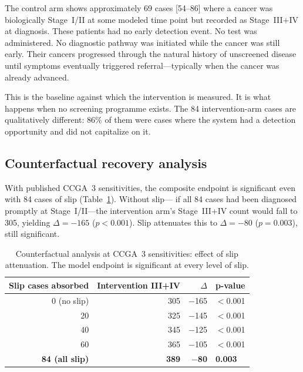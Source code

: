 \documentclass[11pt,letter]{article}
\begin{document}
The control arm shows approximately 69 cases [54--86] where a cancer was
biologically Stage~I/II at some modeled time point but recorded as
Stage~III+IV at diagnosis. These patients had no early detection event.
No test was administered. No diagnostic pathway was initiated while the
cancer was still early. Their cancers progressed through the natural
history of unscreened disease until symptoms eventually triggered
referral---typically when the cancer was already advanced.

This is the baseline against which the intervention is measured. It is
what happens when no screening programme exists. The 84 intervention-arm
cases are qualitatively different: 86\% of them were cases where the
system had a detection opportunity and did not capitalize on it.


\subsection{Counterfactual recovery analysis}
\label{sec:pvalue}

With published CCGA~3 sensitivities, the composite endpoint is significant
even with 84 cases of slip (Table~\ref{tab:pvalue_ccga3}). Without slip---
if all 84 cases had been diagnosed promptly at Stage~I/II---the
intervention arm's Stage~III+IV count would fall to 305, yielding
$\Delta = -165$ ($p < 0.001$). Slip attenuates this to $\Delta = -80$
($p = 0.003$), still significant.

\begin{table}[!ht]\centering
\caption{Counterfactual analysis at CCGA~3 sensitivities: effect of slip
attenuation. The model endpoint is significant at every level of slip.}
\label{tab:pvalue_ccga3}
\begin{tabular}{rrrl}\toprule
Slip cases absorbed & Intervention III+IV & $\Delta$ & p-value \\ \midrule
0 (no slip)    & 305 & $-$165 & $<$0.001 \\
20             & 325 & $-$145 & $<$0.001 \\
40             & 345 & $-$125 & $<$0.001 \\
60             & 365 & $-$105 & $<$0.001 \\
\textbf{84 (all slip)} & \textbf{389} & \textbf{$-$80} & \textbf{0.003} \\
\bottomrule
\end{tabular}
\end{table}
\end{document}
